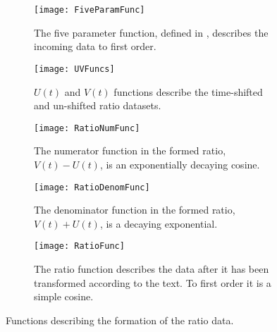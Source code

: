     \begin{figure}
    \centering
        \begin{subfigure}[t]{0.45\textwidth}
            \centering
            \texttt{[image: FiveParamFunc]}
            \caption{The five parameter function, defined in , describes the incoming data to first order.}
        \label{fig:fiveparamfunc}
        \end{subfigure}%

        \vspace{2mm}
        \begin{subfigure}[t]{0.45\textwidth}
            \centering
            \texttt{[image: UVFuncs]}
            \caption{$U(t)$ and $V(t)$ functions describe the time-shifted and un-shifted ratio datasets.}
        \label{fig:UVfuncs}
        \end{subfigure}
        \hspace{5mm}
        \begin{subfigure}[t]{0.45\textwidth}
            \centering
            \texttt{[image: RatioNumFunc]}
            \caption{The numerator function in the formed ratio, $V(t) - U(t)$, is an exponentially decaying cosine.}
        \label{fig:rationumfunc}
        \end{subfigure}%
        \vspace{2mm}
        \begin{subfigure}[t]{0.45\textwidth}
            \centering
            \texttt{[image: RatioDenomFunc]}
            \caption{The denominator function in the formed ratio, $V(t) + U(t)$, is a decaying exponential.}
        \label{fig:ratiodenomfunc}
        \end{subfigure}
        \hspace{5mm}
        \begin{subfigure}[t]{0.45\textwidth}
            \centering
            \texttt{[image: RatioFunc]}
            \caption{The ratio function describes the data after it has been transformed according to the text. To first order it is a simple cosine.}
        \label{fig:ratiofunc}
        \end{subfigure}%
    \caption[Ratio formation functions]{Functions describing the formation of the ratio data.}
    \label{fig:RatioFormationFunctions}
    \end{figure}



